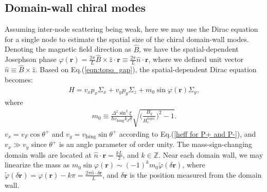 \begin{subappendices}
	\section{Domain-wall chiral modes}\label{app:domain_wall_modes}
	Assuming inter-node scattering being weak, here we may use the Dirac equation for a single node to estimate the spatial size of the chiral domain-wall modes. Denoting the magnetic field direction as $\hat B$, we have the spatial-dependent Josephson phase $\varphi(\bm r)=\frac{2\pi}{L}\hat B\times\hat z  \cdot \bm r\equiv \frac{2\pi}{L}\hat n\cdot \bm r$, where we defined unit vector $\hat n\equiv \hat B\times \hat z$. Based on Eq.(\ref{eqn:topo_gap}), the spatial-dependent Dirac equation becomes:
	\begin{align}
		H=v_x p_x\Sigma_x+v_y p_y\Sigma_z+m_0\sin\varphi(\bm r)\Sigma_y,
	\end{align}
	where
	\begin{align}
		m_0\equiv\frac{\Delta^2\sin^2\xi}{\hbar v_{\text{Ising}}k_F\theta}\sqrt{\Big(\frac{H_y}{H^{\text{topo.}}_{c}}\Big)^2-1}.
	\end{align}
	$v_x=v_F\cos\theta^+$ and $v_y=v_{\text{Ising}}\sin\theta^+$ according to Eq.(\ref{heff for P+ and P-}), and $v_x\gg v_y$ since $\theta^+$ is an angle parameter of order unity.
	The mass-sign-changing domain walls are located at $\hat n\cdot \bm r=\frac{k L}{2}$, and $k\in\mathbb{Z}$. Near each domain wall, we may linearize the mass as $m_0\sin\varphi(\bm r)\sim (-1)^k m_0\tilde \varphi(\delta \bm r)$, where $\tilde\varphi(\delta \bm r)=\varphi(\bm r)-k\pi=\frac{2\pi\hat n\cdot \delta\bm r}{L}$, and $\delta \bm r$ is the position measured from the domain wall.


\end{subappendices}
